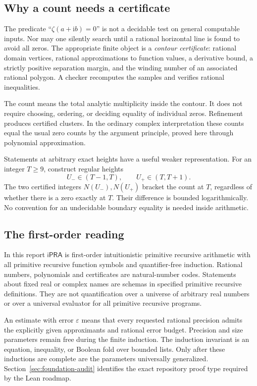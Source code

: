 \documentclass[11pt,letterpaper]{article}
\theoremstyle{definition}
\newcommand{\ipra}{\mathsf{iPRA}}
\newcommand{\ii}{\mathrm i}\newcommand{\ee}{\mathrm e}
\begin{document}
\subsection{Why a count needs a certificate}
The predicate ``$\zeta(a+\ii b)=0$'' is not a decidable test on general
computable inputs. Nor may one silently search until a rational horizontal
line is found to avoid all zeros. The appropriate finite object is a
\emph{contour certificate}: rational domain vertices, rational
approximations to function values, a derivative bound, a strictly positive
separation margin, and the winding number of an associated rational
polygon. A checker recomputes the samples and verifies rational
inequalities.

The count means the total analytic multiplicity inside the contour.
It does not require choosing, ordering, or deciding equality of individual
zeros. Refinement produces certified clusters. In the ordinary complex
interpretation these counts equal the usual zero counts by the argument
principle, proved here through polynomial approximation.

Statements at arbitrary exact heights have a useful weaker representation.
For an integer $T\ge9$, construct regular heights
\[
 U_-\in(T-1,T),\qquad U_+\in(T,T+1).
\]
The two certified integers $N(U_-),N(U_+)$ bracket the count at $T$,
regardless of whether there is a zero exactly at $T$. Their difference is
bounded logarithmically. No convention for an undecidable boundary equality
is needed inside arithmetic.

\subsection{The first-order reading}
In this report $\ipra$ is first-order intuitionistic primitive recursive
arithmetic with all primitive recursive function symbols and
quantifier-free induction. Rational numbers, polynomials and certificates
are natural-number codes. Statements about fixed real or complex names
are schemas in specified primitive recursive definitions. They are not
quantification over a universe of arbitrary real numbers or over a
universal evaluator for all primitive recursive programs.

An estimate with error $\varepsilon$ means that every requested rational
precision admits the explicitly given approximants and rational error
budget. Precision and size parameters remain free during the finite
induction. The induction invariant is an equation, inequality, or Boolean
fold over bounded lists. Only after these inductions are complete are the
parameters universally generalized. Section~\ref{sec:foundation-audit}
identifies the exact repository proof type required by the Lean roadmap.
\end{document}
